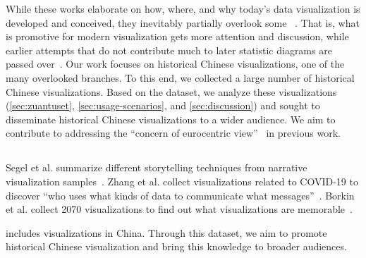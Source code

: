 While these works elaborate on how, where, and why today's data visualization is developed and conceived, they inevitably partially overlook some ~\cite{Ruokkeinen2023Developing}.
That is, what is promotive for modern visualization gets more attention and discussion, while earlier attempts that do not contribute much to later statistic diagrams are passed over~\cite{Ruokkeinen2023Developing}.
Our work focuses on historical Chinese visualizations, one of the many overlooked branches.
To this end, we collected a large number of historical Chinese visualizations.
Based on the dataset, we analyze these visualizations (\cref{sec:zuantuset}, \cref{sec:usage-scenarios}, and \cref{sec:discussion}) and sought to disseminate historical Chinese visualizations to a wider audience.
We aim to contribute to addressing the ``concern of eurocentric view''~\cite{Gunter2021Review} in previous work.





\subsection{}

Segel et al. summarize different storytelling techniques from narrative visualization samples~\cite{Segel2010Narrative}.
Zhang et al. collect visualizations related to COVID-19 to discover ``who uses what kinds of data to communicate what messages''~\cite{Zhang2021Mapping}.
Borkin et al. collect \num{2070} visualizations to find out what visualizations are memorable~\cite{Borkin2013What}.

\datasetName includes visualizations  in China.
Through this dataset, we aim to promote historical Chinese visualization and bring this knowledge to broader audiences.


